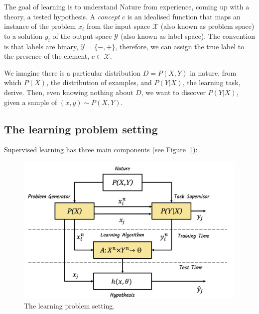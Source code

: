 \documentclass[
  letterpaper,
  12pt,
  british]{tufte-book}
\theoremstyle{plain}
\theoremstyle{definition}
\theoremstyle{plain}
\theoremstyle{remark}
\begin{document}
The goal of learning is to understand Nature from experience, coming up
with a theory, a tested hypothesis. A \emph{concept} \(c\) is an
idealised function that maps an instance of the problem \(\mathit{x}_i\)
from the input space \(\mathcal{X}\) (also known as problem space) to a
solution \(\mathit{y}_i\) of the output space \(\mathcal{Y}\) (also
known as label space). The convention is that labels are binary,
\(\mathcal{Y}= \{-, +\}\), therefore, we can assign the true label to
the presence of the element, \(c \subset \mathcal{X}\).

We imagine there is a particular distribution
\(D= P(\mathit{X},\mathit{Y})\) in nature, from which \(P(\mathit{X})\),
the distribution of examples, and \(P(\mathit{Y}|\mathit{X})\), the
learning task, derive. Then, even knowing nothing about \(D\), we want
to discover \(P(\mathit{Y}|\mathit{X})\), given a sample of
\((x, y) \sim P(\mathit{X},\mathit{Y})\).

\hypertarget{sec-mlt_problem}{%
\subsection{The learning problem setting}\label{sec-mlt_problem}}

Supervised learning has three main components (see
Figure~\ref{fig-learning_problem_setting}):

\begin{figure}

{\centering \includegraphics{Images/learning_problem_setting.png}

}

\caption{\label{fig-learning_problem_setting}The learning problem
setting.}

\end{figure}
\end{document}
